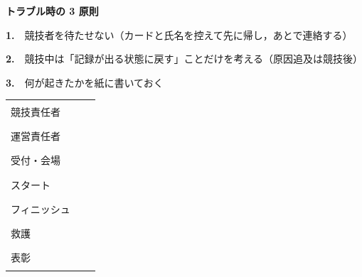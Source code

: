 \vspace{4mm}
\noindent\begin{tcolorbox}[colback=goalbg,colframe=goalfr,boxrule=0.6pt,arc=2pt]
{\sffamily\bfseries トラブル時の 3 原則}\par\vspace{1mm}
\textbf{1.}　競技者を待たせない（カードと氏名を控えて先に帰し，あとで連絡する）\par
\textbf{2.}　競技中は「記録が出る状態に戻す」ことだけを考える（原因追及は競技後）\par
\textbf{3.}　何が起きたかを紙に書いておく\par
\end{tcolorbox}

\vspace{4mm}
\par
\vspace{2mm}
\begin{center}
\small
\begin{tabular}{@{}P{34mm}P{40mm}P{40mm}@{}}
\toprule
{} &  &  \\
\midrule
競技責任者 & \rule{34mm}{0.4pt} & \rule{34mm}{0.4pt} \\
運営責任者 & \rule{34mm}{0.4pt} & \rule{34mm}{0.4pt} \\
受付・会場 & \rule{34mm}{0.4pt} & \rule{34mm}{0.4pt} \\
スタート & \rule{34mm}{0.4pt} & \rule{34mm}{0.4pt} \\
フィニッシュ & \rule{34mm}{0.4pt} & \rule{34mm}{0.4pt} \\
救護 & \rule{34mm}{0.4pt} & \rule{34mm}{0.4pt} \\
表彰 & \rule{34mm}{0.4pt} & \rule{34mm}{0.4pt} \\
\bottomrule
\end{tabular}
\end{center}
